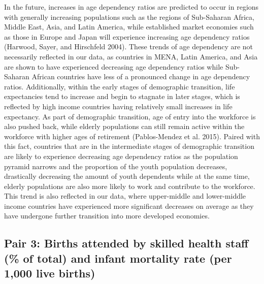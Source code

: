\documentclass[
  letterpaper,
  DIV=11,
  numbers=noendperiod]{scrartcl}
\begin{document}
In the future, increases in age dependency ratios are predicted to occur
in regions with generally increasing populations such as the regions of
Sub-Saharan Africa, Middle East, Asia, and Latin America, while
established market economies such as those in Europe and Japan will
experience increasing age dependency ratios (Harwood, Sayer, and
Hirschfeld 2004). These trends of age dependency are not necessarily
reflected in our data, as countries in MENA, Latin America, and Asia are
shown to have experienced decreasing age dependency ratios while
Sub-Saharan African countries have less of a pronounced change in age
dependency ratios. Additionally, within the early stages of demographic
transition, life expectancies tend to increase and begin to stagnate in
later stages, which is reflected by high income countries having
relatively small increases in life expectancy. As part of demographic
transition, age of entry into the workforce is also pushed back, while
elderly populations can still remain active within the workforce with
higher ages of retirement (Pablos-Mendez et al. 2015). Paired with this
fact, countries that are in the intermediate stages of demographic
transition are likely to experience decreasing age dependency ratios as
the population pyramid narrows and the proportion of the youth
population decreases, drastically decreasing the amount of youth
dependents while at the same time, elderly populations are also more
likely to work and contribute to the workforce. This trend is also
reflected in our data, where upper-middle and lower-middle income
countries have experienced more significant decreases on average as they
have undergone further transition into more developed economies.

\subsection{Pair 3: Births attended by skilled health staff (\% of
total) and infant mortality rate (per 1,000 live
births)}\label{pair-3-births-attended-by-skilled-health-staff-of-total-and-infant-mortality-rate-per-1000-live-births}
\end{document}
